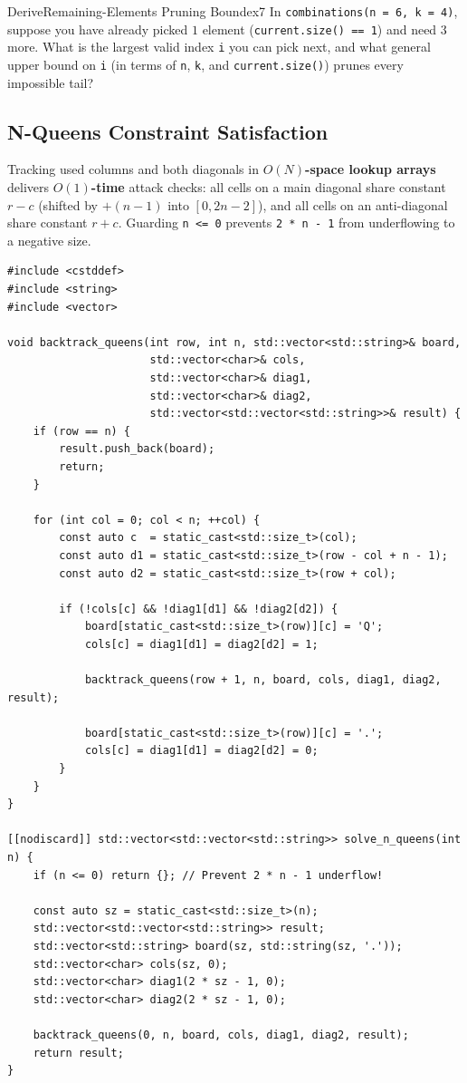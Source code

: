 \documentclass[11pt,a4paper]{article}
\theoremstyle{definition}
\begin{document}
\begin{tryitbox}{Derive}{Remaining-Elements Pruning Bound}{ex7}
In \texttt{combinations(n = 6, k = 4)}, suppose you have already picked $1$ element (\texttt{current.size() == 1}) and need $3$ more. What is the largest valid index \texttt{i} you can pick next, and what general upper bound on \texttt{i} (in terms of \texttt{n}, \texttt{k}, and \texttt{current.size()}) prunes every impossible tail?
\end{tryitbox}

\subsection{N-Queens Constraint Satisfaction}

Tracking used columns and both diagonals in \textbf{$O(N)$-space lookup arrays} delivers \textbf{$O(1)$-time} attack checks: all cells on a main diagonal share constant $r - c$ (shifted by $+(n - 1)$ into $[0, 2n - 2]$), and all cells on an anti-diagonal share constant $r + c$. Guarding \texttt{n <= 0} prevents \texttt{2 * n - 1} from underflowing to a negative size.

\begin{lstlisting}[caption={N-Queens with O(1) Lookup Checks and Zero-Size Guard}]
#include <cstddef>
#include <string>
#include <vector>

void backtrack_queens(int row, int n, std::vector<std::string>& board,
                      std::vector<char>& cols,
                      std::vector<char>& diag1,
                      std::vector<char>& diag2,
                      std::vector<std::vector<std::string>>& result) {
    if (row == n) {
        result.push_back(board);
        return;
    }

    for (int col = 0; col < n; ++col) {
        const auto c  = static_cast<std::size_t>(col);
        const auto d1 = static_cast<std::size_t>(row - col + n - 1);
        const auto d2 = static_cast<std::size_t>(row + col);

        if (!cols[c] && !diag1[d1] && !diag2[d2]) {
            board[static_cast<std::size_t>(row)][c] = 'Q';
            cols[c] = diag1[d1] = diag2[d2] = 1;

            backtrack_queens(row + 1, n, board, cols, diag1, diag2, result);

            board[static_cast<std::size_t>(row)][c] = '.';
            cols[c] = diag1[d1] = diag2[d2] = 0;
        }
    }
}

[[nodiscard]] std::vector<std::vector<std::string>> solve_n_queens(int n) {
    if (n <= 0) return {}; // Prevent 2 * n - 1 underflow!

    const auto sz = static_cast<std::size_t>(n);
    std::vector<std::vector<std::string>> result;
    std::vector<std::string> board(sz, std::string(sz, '.'));
    std::vector<char> cols(sz, 0);
    std::vector<char> diag1(2 * sz - 1, 0);
    std::vector<char> diag2(2 * sz - 1, 0);

    backtrack_queens(0, n, board, cols, diag1, diag2, result);
    return result;
}
\end{lstlisting}
\end{document}
